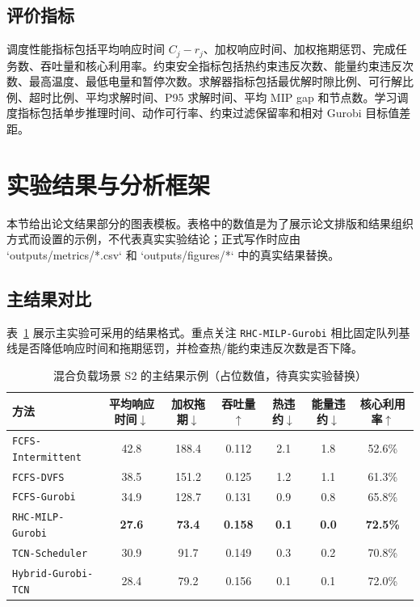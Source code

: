 \documentclass[conference]{IEEEtran}
\newcommand{\rhc}{\texttt{RHC-MILP-Gurobi}}
\newcommand{\fcfsg}{\texttt{FCFS-Gurobi}}
\newcommand{\dvfs}{\texttt{FCFS-DVFS}}
\newcommand{\intermittent}{\texttt{FCFS-Intermittent}}
\newcommand{\tcns}{\texttt{TCN-Scheduler}}
\newcommand{\hybrid}{\texttt{Hybrid-Gurobi-TCN}}
\begin{document}
\subsection{评价指标}

调度性能指标包括平均响应时间 $C_j-r_j$、加权响应时间、加权拖期惩罚、完成任务数、吞吐量和核心利用率。约束安全指标包括热约束违反次数、能量约束违反次数、最高温度、最低电量和暂停次数。求解器指标包括最优解时隙比例、可行解比例、超时比例、平均求解时间、P95 求解时间、平均 MIP gap 和节点数。学习调度指标包括单步推理时间、动作可行率、约束过滤保留率和相对 Gurobi 目标值差距。

\section{实验结果与分析框架}

本节给出论文结果部分的图表模板。表格中的数值是为了展示论文排版和结果组织方式而设置的示例，不代表真实实验结论；正式写作时应由 `outputs/metrics/*.csv` 和 `outputs/figures/*` 中的真实结果替换。

\subsection{主结果对比}

表~\ref{tab:main-results} 展示主实验可采用的结果格式。重点关注 \rhc{} 相比固定队列基线是否降低响应时间和拖期惩罚，并检查热/能约束违反次数是否下降。

\begin{table}[t]
\centering
\caption{混合负载场景 S2 的主结果示例（占位数值，待真实实验替换）}
\label{tab:main-results}
\begin{tabular}{lcccccc}
\toprule
方法 & 平均响应时间$\downarrow$ & 加权拖期$\downarrow$ & 吞吐量$\uparrow$ & 热违约$\downarrow$ & 能量违约$\downarrow$ & 核心利用率$\uparrow$ \\
\midrule
\intermittent{} & 42.8 & 188.4 & 0.112 & 2.1 & 1.8 & 52.6\% \\
\dvfs{} & 38.5 & 151.2 & 0.125 & 1.2 & 1.1 & 61.3\% \\
\fcfsg{} & 34.9 & 128.7 & 0.131 & 0.9 & 0.8 & 65.8\% \\
\rhc{} & \textbf{27.6} & \textbf{73.4} & \textbf{0.158} & \textbf{0.1} & \textbf{0.0} & \textbf{72.5\%} \\
\tcns{} & 30.9 & 91.7 & 0.149 & 0.3 & 0.2 & 70.8\% \\
\hybrid{} & 28.4 & 79.2 & 0.156 & 0.1 & 0.1 & 72.0\% \\
\bottomrule
\end{tabular}
\end{table}
\end{document}
